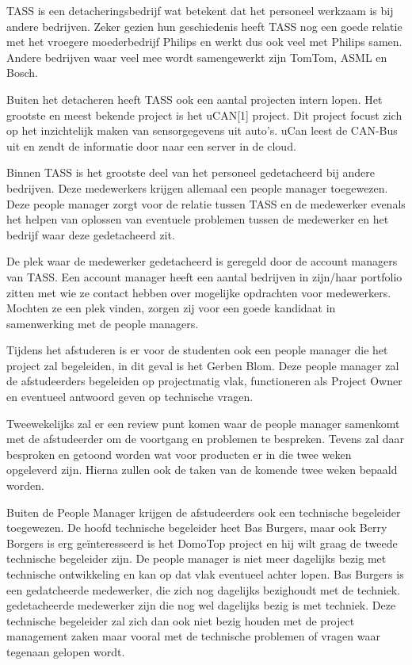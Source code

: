 \documentclass[]{article}
\begin{document}
TASS is een detacheringsbedrijf wat betekent dat het personeel werkzaam is bij
andere bedrijven. Zeker gezien hun geschiedenis heeft TASS nog een goede
relatie met het vroegere moederbedrijf Philips en werkt dus ook veel met Philips
samen. Andere bedrijven waar veel mee wordt samengewerkt zijn TomTom, ASML
en Bosch.

Buiten het detacheren heeft TASS ook een aantal projecten intern lopen. Het
grootste en meest bekende project is het uCAN[1] project. Dit project
focust zich op het inzichtelijk maken van sensorgegevens uit auto's. uCan
leest de CAN-Bus uit en zendt de informatie door naar een server in de
cloud.

Binnen TASS is het grootste deel van het personeel gedetacheerd bij andere
bedrijven. Deze medewerkers krijgen allemaal een people manager toegewezen.
Deze people manager zorgt voor de relatie tussen TASS en de medewerker evenals
het helpen van oplossen van eventuele problemen tussen de medewerker en het bedrijf waar deze
gedetacheerd zit.

De plek waar de medewerker gedetacheerd is geregeld door de account
managers van TASS. Een account manager heeft een aantal bedrijven in
zijn/haar portfolio zitten met wie ze contact hebben over mogelijke
opdrachten voor medewerkers. Mochten ze een plek vinden, zorgen zij voor
een goede kandidaat in samenwerking met de people managers.

Tijdens het afstuderen is er voor de studenten ook een people manager
die het project zal begeleiden, in dit geval is het Gerben Blom. Deze
people manager zal de afstudeerders begeleiden op projectmatig vlak,
functioneren als Project Owner en eventueel antwoord geven op technische
vragen.

Tweewekelijks zal er een review punt komen waar de people manager
samenkomt met de afstudeerder om de voortgang en problemen te bespreken.
Tevens zal daar besproken en getoond worden wat voor producten er in die twee weken
opgeleverd zijn. Hierna zullen ook de taken van de komende twee weken
bepaald worden.

Buiten de People Manager krijgen de afstudeerders ook een technische
begeleider toegewezen. De hoofd technische begeleider heet Bas Burgers,
maar ook Berry Borgers is erg ge\"interesseerd is het DomoTop project en hij
wilt graag de tweede technische begeleider zijn. De people manager is
niet meer dagelijks bezig met technische ontwikkeling en kan op dat vlak
eventueel achter lopen. Bas Burgers is een gedatcheerde medewerker, die zich nog
dagelijks bezighoudt met de techniek.
gedetacheerde medewerker zijn die nog wel dagelijks bezig is met techniek.
Deze technische begeleider zal zich dan ook niet bezig houden met de
project management zaken maar vooral met de technische problemen of vragen
waar tegenaan gelopen wordt.
\end{document}
